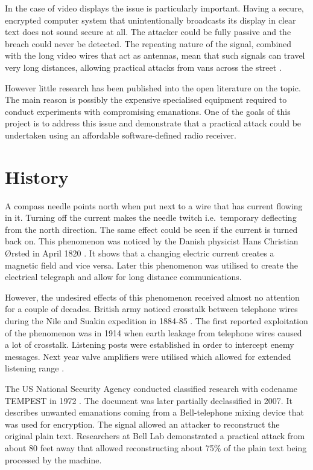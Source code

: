 \documentclass[a4paper,12pt,twoside,openright]{report}
\begin{document}
In the case of video displays the issue is particularly important. Having a secure, encrypted computer system that unintentionally broadcasts its display in clear text does not sound secure at all. The attacker could be fully passive and the breach could never be detected. The repeating nature of the signal, combined with the long video wires that act as antennas, mean that such signals can travel very long distances, allowing practical attacks from vans across the street \cite{van1985electromagnetic}.

However little research has been published into the open literature on the topic. The main reason is possibly the expensive specialised equipment required to conduct experiments with compromising emanations. One of the goals of this project is to address this issue and demonstrate that a practical attack could be undertaken using an affordable software-defined radio receiver.

\section{History}

A compass needle points north when put next to a wire that has current flowing in it. Turning off the current makes the needle twitch i.e.\  temporary deflecting from the north direction. The same effect could be seen if the current is turned back on. This phenomenon was noticed by the Danish physicist Hans Christian \O rsted in April 1820 \cite{jelved1998selected}. It shows that a changing electric current creates a magnetic field and vice versa. Later this phenomenon was utilised to create the electrical telegraph and allow for long distance communications.

However, the undesired effects of this phenomenon received almost no attention for a couple of decades. British army noticed crosstalk between telephone wires during the Nile and Suakin expedition in 1884-85 \cite{nalder1958history}. The first reported exploitation of the phenomenon was in 1914 when earth leakage from telephone wires caused a lot of crosstalk. Listening posts were established in order to intercept enemy messages. Next year valve amplifiers were utilised which allowed for extended listening range \cite{anderson2008security}.

The US National Security Agency conducted classified research with codename TEMPEST in 1972 \cite{friedman2007tempest}. The document was later partially declassified in 2007. It describes unwanted emanations coming from a Bell-telephone mixing device that was used for encryption. The signal allowed an attacker to reconstruct the original plain text. Researchers at Bell Lab demonstrated a practical attack from about 80 feet away that allowed reconstructing about 75\% of the plain text being processed by the machine.
\end{document}
